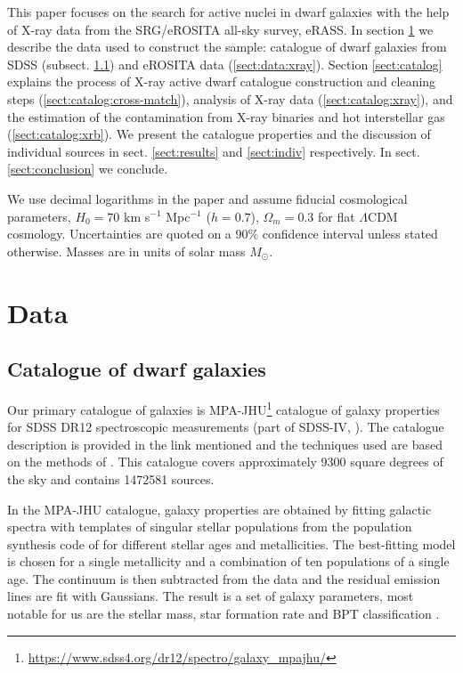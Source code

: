 \documentclass[fleqn,usenatbib]{mnras}
\newcommand{\msun}{M_\odot}
\begin{document}
This paper focuses on the search for active nuclei in dwarf galaxies with the help of X-ray data from the SRG/eROSITA all-sky survey, eRASS. In section \ref{sect:data} we describe the data used to construct the sample: catalogue of dwarf galaxies from SDSS (subsect. \ref{sect:data:galaxy}) and eROSITA data (\ref{sect:data:xray}). Section \ref{sect:catalog} explains the process of X-ray active dwarf catalogue construction and cleaning steps (\ref{sect:catalog:cross-match}), analysis of X-ray data (\ref{sect:catalog:xray}), and the estimation of the contamination from X-ray binaries and hot interstellar gas (\ref{sect:catalog:xrb}).  We present the catalogue properties and the discussion of individual sources in sect.  \ref{sect:results} and \ref{sect:indiv} respectively. In sect. \ref{sect:conclusion} we conclude.


We use decimal logarithms in the paper and assume fiducial cosmological parameters, $H_0=70$ km s$^{-1}$ Mpc$^{-1}$ ($h=0.7$), $\Omega_m=0.3$ for flat $\Lambda$CDM cosmology. Uncertainties are quoted on a 90\% confidence interval unless stated otherwise. Masses are in units of solar mass $\msun$.


\section{Data}
\label{sect:data}
\subsection{Catalogue of dwarf galaxies}
\label{sect:data:galaxy}
Our primary catalogue of galaxies is  MPA-JHU\footnote{\url{https://www.sdss4.org/dr12/spectro/galaxy_mpajhu/}} catalogue of galaxy properties for SDSS DR12 spectroscopic measurements (part of SDSS-IV, \citealt{Alam2015}). The catalogue description is provided in the link mentioned and the techniques used are based on the methods of \citet{Kauffmann2003, Brinchmann2004, Tremonti2004}. This catalogue covers approximately 9300 square degrees of the sky and contains 1472581 sources. 

In the MPA-JHU catalogue, galaxy properties are obtained by fitting galactic spectra with templates of singular stellar populations from the population synthesis code of \citet{Bruzual2003} for different stellar ages and metallicities. The best-fitting model is chosen for a single metallicity and a combination of ten populations of a single age.  The continuum is then subtracted from the data and the residual emission lines are fit with Gaussians.  The result is a set of galaxy parameters, most notable for us are the stellar mass, star formation rate and BPT classification \citep{Baldwin1981}.  
\end{document}
